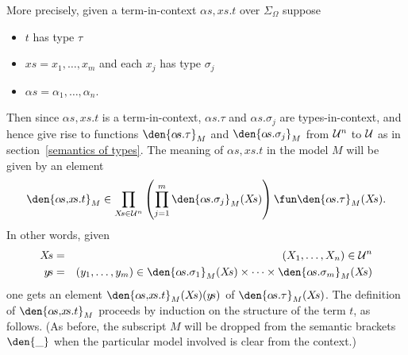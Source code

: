 More precisely, given a term-in-context $\alpha\!s,\!x\!s.t$
over $\Sigma_{\Omega}$ suppose
\begin{itemize}
 
\item $t$ has type $\tau$
 
\item $x\!s=x_{1},\ldots,x_{m}$ and each $x_{j}$ has type $\sigma_{j}$
 
\item $\alpha\!s=\alpha_{1},\ldots,\alpha_{n}$.

\end{itemize}
Then since $\alpha\!s,\!x\!s.t$ is a term-in-context, $\alpha\!s.\tau$
and $\alpha\!s.\sigma_{j}$ are types-in-context, and hence give rise
to functions $\den{\alpha\!s.\tau}_{M}$ and
$\den{\alpha\!s.\sigma_{j}}_{M}$ from ${\cal U}^{n}$ to $\cal U$ as in
section~\ref{semantics of types}. The meaning of $\alpha\!s,\!x\!s.t$
in the model $M$ will be given by an element
\[ 
\den{\alpha\!s,\!x\!s.t}_{M} \in \prod_{X\!s\in{\cal U}^{n}}
\left(\prod_{j=1}^{m}\den{\alpha\!s.\sigma_{j}}_{M}(X\!s)\right) 
\fun \den{\alpha\!s.\tau}_{M}(X\!s) .
\]
In other words, given 
\begin{eqnarray*}
X\!s & = & (X_{1},\ldots,X_{n})\in{\cal U}^{n} \\
y\!s & = & (y_{1},\ldots,y_{m})\in\den{\alpha\!s.\sigma_{1}}_{M}(X\!s)
           \times\cdots\times \den{\alpha\!s.\sigma_{m}}_{M}(X\!s)
\end{eqnarray*}
one gets an element $\den{\alpha\!s,\!x\!s.t}_{M}(X\!s)(y\!s)$ of
$\den{\alpha\!s.\tau}_{M}(X\!s)$. The definition of
$\den{\alpha\!s,\!x\!s.t}_{M}$ proceeds by induction on the structure of
the term $t$, as follows. (As before, the subscript $M$ will be dropped from
the semantic brackets $\den{ \_ }$ when the particular model involved is
clear from the context.)
